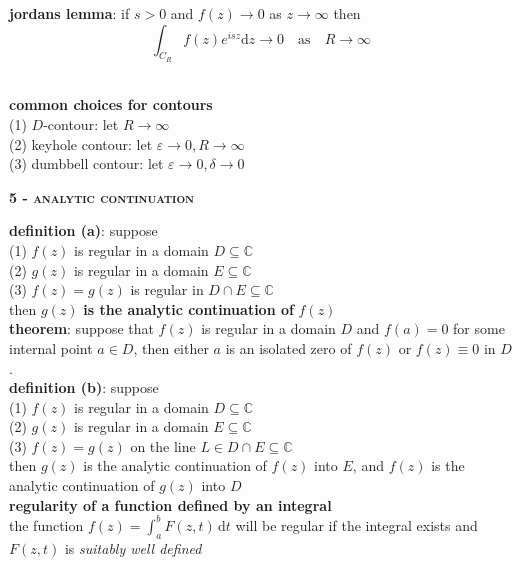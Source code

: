 \documentclass[a4paper]{article}
\begin{document}
\begin{multicols}{2}
\begin{framed}
	\noindent
	\textbf{jordans lemma}: if $s > 0$ and $f(z) \rightarrow 0$ as $z \rightarrow \infty$ then
	$$\int_{C_R} f(z) e^{isz} \textrm{d}z \rightarrow 0 \quad \text{as} \quad R \rightarrow \infty$$\
	
	\noindent
	\textbf{common choices for contours}\\
	(1) $D$-contour: let $R \rightarrow \infty$\\
	(2) keyhole contour: let $\varepsilon \rightarrow 0, R \rightarrow \infty$\\
	(3) dumbbell contour: let $\varepsilon \rightarrow 0, \delta \rightarrow 0$
\end{framed}

\begin{framed}
	\begin{center}
		\textbf{\textsc{5 - analytic continuation}}
	\end{center}
	
	\noindent
	\textbf{definition (a)}: suppose\\
	(1) $f(z)$ is regular in a domain $D \subseteq \mathbb{C}$\\
	(2) $g(z)$ is regular in a domain $E \subseteq \mathbb{C}$\\
	(3) $f(z) = g(z)$ is regular in $D \cap E \subseteq \mathbb{C}$\\
	then $g(z)$ \textbf{is the analytic continuation of} $f(z)$\\
	
	\noindent
	\textbf{theorem}: suppose that $f(z)$ is regular in a domain $D$ and $f(a) = 0$ for some internal point $a \in D$, then either $a$ is an isolated zero of $f(z)$ or $f(z) \equiv 0$ in $D$.\\
	
	\noindent
	\textbf{definition (b)}: suppose\\
	(1) $f(z)$ is regular in a domain $D \subseteq \mathbb{C}$\\
	(2) $g(z)$ is regular in a domain $E \subseteq \mathbb{C}$\\
	(3) $f(z) = g(z)$ on the line $L \in D \cap E \subseteq \mathbb{C}$\\
	then $g(z)$ is the analytic continuation of $f(z)$ into $E$, and $f(z)$ is the analytic continuation of $g(z)$ into $D$\\
	
	\noindent
	\textbf{regularity of a function defined by an integral}\\
	the function $f(z) = \int^b_a F(z, t) \, \mathrm{d}t$ will be regular if the integral exists and $F(z, t)$ is \textit{suitably well defined}\\
	

\end{framed}
\end{multicols}
\end{document}
